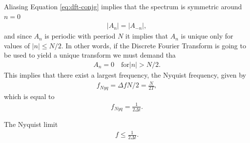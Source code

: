 \documentclass[xcolor=dvipsnames,notes]{beamer}
\begin{document}
\begin{frame}{Aliasing}
Equation \eqref{eq:dft-conjg} implies that the spectrum is symmetric around $n=0$
\begin{eqnarray}
|A_n|=|A_{-n}|,
\end{eqnarray}
and since $A_n$ is periodic with peeriod $N$ it implies that $A_n$ is unique only for
values of $|n| \leq N/2$. In other words, if the Discrete Fourier Transform is going to
be used to yield a unique transform we must demand tha
%
\begin{eqnarray}
  A_{n} = 0 \quad \mbox{for} |n|> N/2.  
\end{eqnarray}
%
This implies that there exist a largest frequency, the Nyquist frequency, given by
%
\begin{eqnarray}
  f_{Nyq}=\Delta f N/2 = \frac{N}{2T},
\end{eqnarray}
which is equal to
\begin{eqnarray}
 f_{Nyq}= \frac{1}{2\Delta t}.
\label{eq:fnyq}
\end{eqnarray}
\end{frame}
\begin{frame}{The Nyquist limit}
%
\begin{eqnarray}
  f \leq  \frac{1}{2\Delta t}.
\label{eq:nyqcond}
\end{eqnarray}
%
\end{frame}
\end{document}
